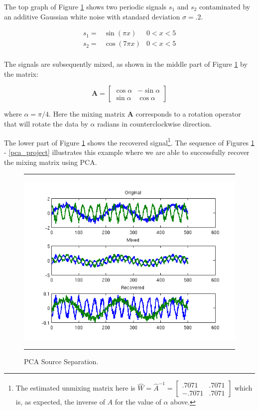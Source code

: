 \documentclass[11pt, oneside, a4paper]{report}
\begin{document}
The top graph of Figure \ref{pca_time_series} shows two periodic
signals $s_1$ and $s_2$ contaminated by an additive Gaussian white
noise with standard deviation $\sigma = .2$.


\begin{equation}
      \begin{array}{lll}
        s_1 = & \sin(\pi x) & 0<x<5\\
        s_2 = & \cos(7 \pi x) & 0<x<5\\
    \end{array}
\end{equation}

The signals are subsequently mixed, as shown in the middle part of
Figure \ref{pca_time_series} by the matrix:


\begin{equation}
  \boldsymbol{A} = \begin{bmatrix} \cos \alpha & -\sin \alpha \\ \sin \alpha & \cos \alpha \end{bmatrix}
\end{equation}

where $\alpha = \pi/4$. Here the mixing matrix $\boldsymbol{A}$ corresponds to a
rotation operator that will rotate the data by $\alpha$ radians in
counterclockwise direction. 


The lower part of Figure \ref{pca_time_series} shows the recovered
signal\footnote{The estimated unmixing matrix here is $\hat{W} =
\hat{A}^{-1} = \begin{bmatrix} .7071 & .7071 \\ -.7071 &
.7071 \end{bmatrix}$ which is, as expected, the inverse of $A$ for
the value of $\alpha$ above.}. The sequence of Figures \ref{pca_time_series} - \ref{pca_project}
illustrates this example where we are able to successfully recover the
mixing matrix using PCA.



\begin{figure}
  \centering
  \hrule
  \includegraphics[width = .9\textwidth]{Figures/pca_signal_time_series}
  \hrule
  \caption{PCA Source Separation.}
  \label{pca_time_series}
\end{figure}
\end{document}
